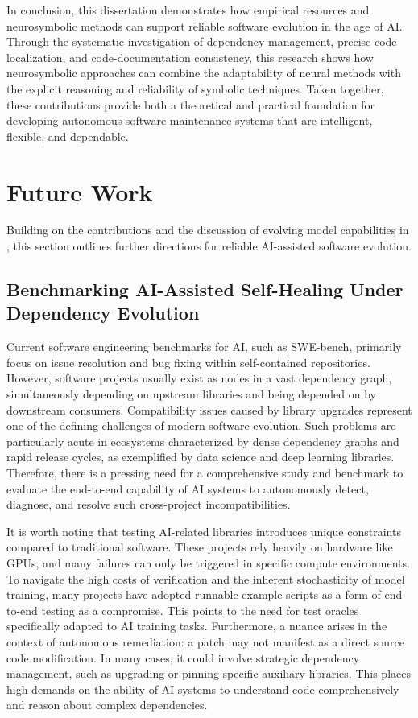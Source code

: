 In conclusion, this dissertation demonstrates how empirical resources and neurosymbolic methods can support reliable software evolution in the age of AI. Through the systematic investigation of dependency management, precise code localization, and code-documentation consistency, this research shows how neurosymbolic approaches can combine the adaptability of neural methods with the explicit reasoning and reliability of symbolic techniques. Taken together, these contributions provide both a theoretical and practical foundation for developing autonomous software maintenance systems that are intelligent, flexible, and dependable.





\section{Future Work}
Building on the contributions and the discussion of evolving model capabilities in , this section outlines further directions for reliable AI-assisted software evolution. 

\subsection{Benchmarking AI-Assisted Self-Healing Under Dependency Evolution}
Current software engineering benchmarks for AI, such as SWE-bench, primarily focus on issue resolution and bug fixing within self-contained repositories. 
However, software projects usually exist as nodes in a vast dependency graph, simultaneously depending on upstream libraries and being depended on by downstream consumers. Compatibility issues caused by library upgrades represent one of the defining challenges of modern software evolution. Such 
problems are particularly acute in ecosystems characterized by dense dependency graphs and rapid release cycles, as exemplified by data science and deep learning libraries. Therefore, there is a pressing need for a comprehensive study and benchmark to evaluate the end-to-end capability of AI systems to autonomously detect, diagnose, and resolve such cross-project incompatibilities.

It is worth noting that testing AI-related libraries introduces unique constraints compared to traditional software. These projects rely heavily on hardware like GPUs, and many failures can only be triggered in specific compute environments. To navigate the high costs of verification and the inherent stochasticity of model training, many projects have adopted runnable example scripts as a form of end-to-end testing as a compromise. This points to the need for test oracles specifically adapted to AI training tasks. Furthermore, a nuance arises in the context of autonomous remediation: a patch may not manifest as a direct source code modification. In many cases, it could involve strategic dependency management, such as upgrading or pinning specific auxiliary libraries. This places high demands on the ability of AI systems to understand code comprehensively and reason about complex dependencies.

